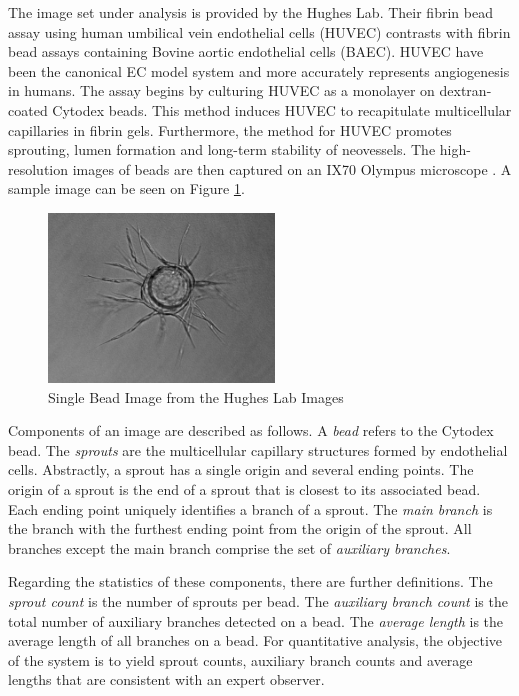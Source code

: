 \documentclass{sig-alternate}
\begin{document}
	The image set under analysis is provided by the Hughes Lab. Their
	fibrin bead assay using human umbilical vein endothelial cells (HUVEC)
	contrasts with fibrin bead assays containing Bovine aortic endothelial
	cells (BAEC). HUVEC have been the canonical EC model system and more
	accurately represents angiogenesis in humans. The assay begins by
	culturing HUVEC as a monolayer on dextran-coated Cytodex beads. This
	method induces HUVEC to recapitulate multicellular capillaries in
	fibrin gels. Furthermore, the method for HUVEC promotes sprouting,
	lumen formation and long-term stability of neovessels. The
	high-resolution images of beads are then captured on an IX70 Olympus
	microscope \cite{nakatsu03}. A sample image can be seen on Figure
	\ref{fig:monobead}.

	\begin{figure}[ht]
		\centering
		\includegraphics[width=6cm]{images/mono.jpg}
		\caption{Single Bead Image from the Hughes Lab Images}
		\label{fig:monobead}
	\end{figure}

	Components of an image are described as follows. A \emph{bead} refers
	to the Cytodex bead. The \emph{sprouts} are the multicellular
	capillary structures formed by endothelial cells. Abstractly, a sprout has
	a single origin and several ending points. The origin of a sprout is the
	end of a sprout that is closest to its associated bead. Each ending point
	uniquely identifies a branch of a sprout. The \emph{main branch} is the
	branch with the furthest ending point from the origin of the sprout. All
	branches except the main branch comprise the set of \emph{auxiliary
	branches}.
	
	Regarding the statistics of these components, there are further
	definitions. The \emph{sprout count} is the number of sprouts per
	bead. The \emph{auxiliary branch count} is the total number of auxiliary
	branches detected on a bead. The \emph{average length} is the average
	length of all branches on a bead. For quantitative analysis, the objective
	of the system is to yield sprout counts, auxiliary branch counts and
	average lengths that are consistent with an expert observer.
\end{document}
